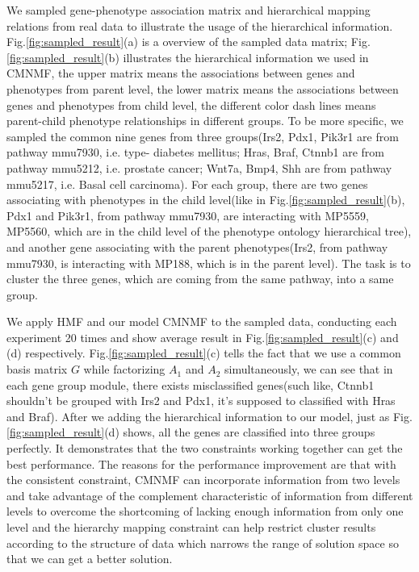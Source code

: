 \documentclass{bmcart}
\begin{document}
 We sampled gene-phenotype association matrix and hierarchical mapping relations from real data to illustrate the usage of the hierarchical information. Fig.\ref{fig:sampled_result}(a) is a overview of the sampled data matrix; Fig.\ref{fig:sampled_result}(b) illustrates the hierarchical information we used in CMNMF, the upper matrix means the associations between genes and phenotypes from parent level, the lower matrix means the associations between genes and phenotypes from child level, the different color dash lines means parent-child phenotype relationships in different groups.
To be more specific, we sampled the common nine genes from three groups(Irs2, Pdx1, Pik3r1 are from pathway mmu7930, i.e. type-\uppercase\expandafter{} diabetes mellitus; Hras, Braf, Ctnnb1 are from pathway mmu5212, i.e. prostate cancer; Wnt7a, Bmp4, Shh are from pathway mmu5217, i.e. Basal cell carcinoma). For each group, there are two genes associating with phenotypes in the child level(like in Fig.\ref{fig:sampled_result}(b), Pdx1 and Pik3r1, from pathway mmu7930, are interacting with MP5559, MP5560, which are in the child level of the phenotype ontology hierarchical tree), and another gene associating with the parent phenotypes(Irs2, from pathway mmu7930, is interacting with MP188, which is in the parent level). The task is to cluster the three genes, which are coming from the same pathway, into a same group.

  We apply HMF and our model CMNMF to the sampled data, conducting each experiment 20 times and show average result in Fig.\ref{fig:sampled_result}(c) and (d) respectively. Fig.\ref{fig:sampled_result}(c) tells the fact that we use a common basis matrix $G$ while factorizing $A_1$ and $A_2$ simultaneously, we can see that in each gene group module, there exists misclassified genes(such like, Ctnnb1 shouldn't be grouped with Irs2 and Pdx1, it's supposed to classified with Hras and Braf). After we adding the hierarchical information to our model, just as Fig.\ref{fig:sampled_result}(d) shows, all the genes are classified into three groups perfectly. It demonstrates that the two constraints working together can get the best performance. The reasons for the performance improvement are that with the consistent constraint, CMNMF can incorporate information from two levels and take advantage of the complement characteristic of information from different levels to overcome the shortcoming of lacking enough information from only one level and the hierarchy mapping constraint can help restrict cluster results according to the structure of data which narrows the range of solution space so that we can get a better solution.
\end{document}
